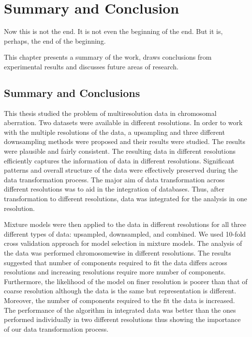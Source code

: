 \chapter{Summary and Conclusion}
\label{ch:summary}

\begin{fquote}Now this is not the end. It is not even the beginning of the end. But it is, perhaps, the end of the beginning.  \end{fquote} 
\begin{synopsis}
This chapter presents a summary of the work, draws conclusions from experimental results and discusses future areas of research.
\end{synopsis}

\section{Summary and Conclusions}
\label{s:summary}
This thesis studied the problem of multiresolution data in chromosomal aberration. Two datasets were available in different resolutions. In order to work with the multiple resolutions of the data, a upsampling and three different downsampling methods were proposed and their results were studied. The results were plausible and fairly consistent. The resulting data in different resolutions efficiently captures the information of data in different resolutions. Significant patterns and overall structure of the data were effectively preserved during the data transformation process. The major aim of data transformation across different resolutions was to aid in the integration of databases. Thus, after transformation to different resolutions, data was integrated for the analysis in one resolution. 

Mixture models were then applied to the data in different resolutions for all three different types of data: upsampled, downsampled, and combined. We used 10-fold cross validation approach for model selection in mixture models. The analysis of the data was performed chromosomewise in different resolutions. The results suggested that number of components required to fit the data differs across resolutions and increasing resolutions require more number of components. Furthermore, the likelihood of the model on finer resolution is poorer than that of coarse resolution although the data is the same but representation is different. Moreover, the number of components required to the fit the data is increased. The performance of the algorithm in integrated data was better than the ones performed individually in two different resolutions thus showing the importance of our data transformation process.

